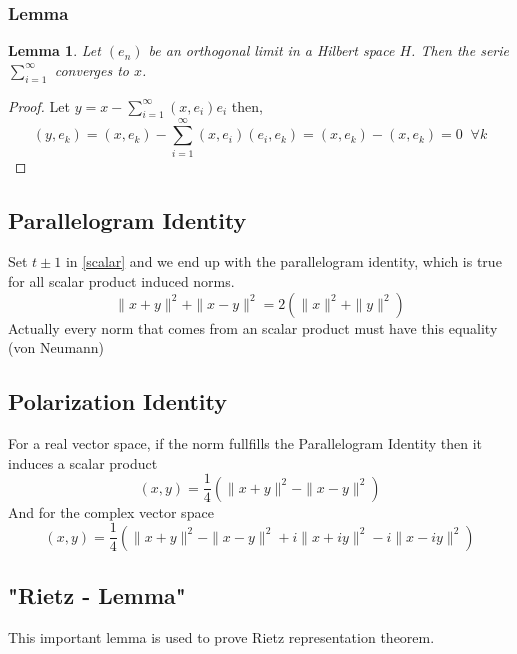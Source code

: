 \documentclass[titlepage]{article}
\newtheorem{lem}[thm]{Lemma}
\begin{document}
\subsubsection{Lemma}
\begin{lem}
Let $(e_n)$ be an orthogonal limit in a Hilbert space $H$. Then the serie $\sum_{i=1}^\infty$ converges to $x$.
\end{lem}
\begin{proof}
Let $y = x - \sum_{i = 1}^\infty (x,e_i)e_i$ then, 
\begin{equation}
(y,e_k) = (x,e_k) - \sum_{i = 1}^\infty (x,e_i)(e_i,e_k) = (x,e_k) - (x,e_k) = 0 \;\; \forall k
\end{equation}
\end{proof}

\subsection{Parallelogram Identity}
Set $t\pm 1$ in \eqref{scalar} and we end up with the parallelogram identity, which is true for all scalar product induced norms.
\begin{equation}
\label{parallel}
\|x+y\|^2 + \|x-y\|^2 = 2\left(\|x\|^2+ \|y\|^2 \right)
\end{equation}
Actually every norm that comes from an scalar product must have this equality (von Neumann)
\subsection{Polarization Identity}
For a real vector space, if the norm fullfills the Parallelogram Identity then it induces a scalar product
\begin{equation}
(x,y) = \frac{1}{4}\left(\|x+y\|^2 - \|x-y\|^2\right)
\label{polreel}
\end{equation}
And for the complex vector space
\begin{equation}
(x,y) = \frac{1}{4}\left(\|x+y\|^2 - \|x-y\|^2 +i\|x+iy\|^2 - i\|x-iy\|^2   \right)
\label{polcomp}
\end{equation}


\subsection{"Rietz - Lemma"}
This important lemma is used to prove Rietz representation theorem.
\end{document}
